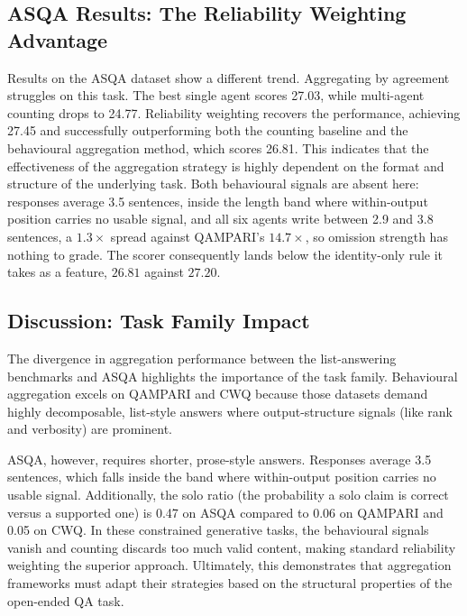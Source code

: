 \documentclass[11pt]{article}
\begin{document}
\subsection{ASQA Results: The Reliability Weighting Advantage}
\label{sec:rq3}


Results on the ASQA dataset show a different trend. Aggregating by agreement struggles on this task. The best single agent scores 27.03, while multi-agent counting drops to 24.77. Reliability weighting recovers the performance, achieving 27.45 and successfully outperforming both the counting baseline and the behavioural aggregation method, which scores 26.81. This indicates that the effectiveness of the aggregation strategy is highly dependent on the format and structure of the underlying task. Both behavioural signals are absent here: responses average 3.5 sentences, inside the length band where within-output position carries no usable signal, and all six agents write between 2.9 and 3.8 sentences, a $1.3\times$ spread against QAMPARI's $14.7\times$, so omission strength has nothing to grade. The scorer consequently lands below the identity-only rule it takes as a feature, $26.81$ against $27.20$.

\subsection{Discussion: Task Family Impact}

The divergence in aggregation performance between the list-answering benchmarks and ASQA highlights the importance of the task family. Behavioural aggregation excels on QAMPARI and CWQ because those datasets demand highly decomposable, list-style answers where output-structure signals (like rank and verbosity) are prominent.

ASQA, however, requires shorter, prose-style answers. Responses average 3.5 sentences, which falls inside the band where within-output position carries no usable signal. Additionally, the solo ratio (the probability a solo claim is correct versus a supported one) is 0.47 on ASQA compared to 0.06 on QAMPARI and 0.05 on CWQ. In these constrained generative tasks, the behavioural signals vanish and counting discards too much valid content, making standard reliability weighting the superior approach. Ultimately, this demonstrates that aggregation frameworks must adapt their strategies based on the structural properties of the open-ended QA task.
\end{document}
